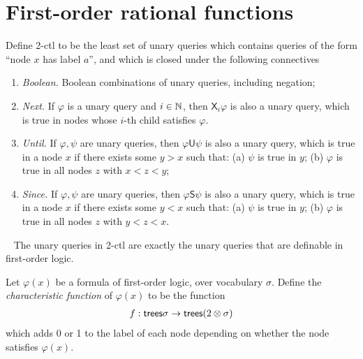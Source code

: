 \section{First-order rational functions}\label{sec:fo-rational}




\newcommand{\nextmod}{\mathsf X}
\newcommand{\untilmod}{\mathsf U}
\newcommand{\sincemod}{\mathsf S}


\begin{definition}[2-ctl]
    Define 2-ctl to be the least set of unary queries which contains queries of the form ``node $x$ has label $a$'', and which is closed under the following connectives
    \begin{enumerate}
        \item \emph{Boolean.} Boolean combinations of unary queries, including negation;
        \item \emph{Next.} If $\varphi$ is a unary query and $i \in {\mathbb N}$, then  $\nextmod_i \varphi$ is also a unary query, which is true in nodes whose $i$-th child satisfies $\varphi$.
         \item \emph{Until.} If $\varphi,\psi$ are  unary queries, then  $\varphi \untilmod \psi$ is also a unary query, which is true in a node $x$ if there exists some $y > x$ such that: (a) $\psi$ is true in $y$; (b) $\varphi$ is true in all nodes $z$ with $x < z < y$;
         \item \emph{Since.} If $\varphi,\psi$ are  unary queries, then  $\varphi \sincemod \psi$ is also a unary query, which is true in a node $x$ if there exists some $y < x$ such that: (a) $\psi$ is true in $y$; (b) $\varphi$ is true in all nodes $z$ with $y < z < x$.
    \end{enumerate}
\end{definition}
\begin{theorem} ~\cite[Theorem 2.6]{schlingloff1992expressive} The unary queries in 2-ctl are exactly the unary queries that are definable in first-order logic.
\end{theorem}

\begin{definition}
    Let $\varphi(x)$ be a formula of first-order logic, over vocabulary $\sigma$. Define the \emph{characteristic function} of $\varphi(x)$ to be the function
            \begin{align*}
                f : \mathsf {trees} \sigma \to \mathsf {trees} (2 \otimes \sigma)
            \end{align*}
            which adds 0 or 1 to  the label of each node depending on whether the node satisfies $\varphi(x)$.
\end{definition}


